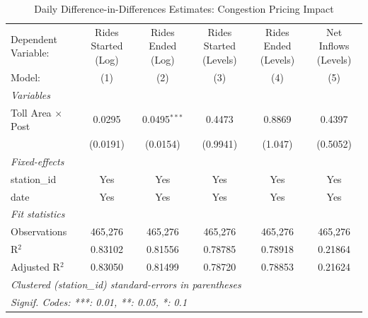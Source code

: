
\begin{table}[htbp]
   \caption{\label{tab:did_static_daily} Daily Difference-in-Differences Estimates: Congestion Pricing Impact}
   \centering
   \begin{tabular}{lccccc}
      \tabularnewline \midrule \midrule
      Dependent Variable:      & Rides Started (Log) & Rides Ended (Log) & Rides Started (Levels) & Rides Ended (Levels) & Net Inflows (Levels) \\   
      Model:                   & (1)                 & (2)               & (3)                    & (4)                  & (5)\\  
      \midrule
      \emph{Variables}\\
      Toll Area $\times$ Post  & 0.0295              & 0.0495$^{***}$    & 0.4473                 & 0.8869               & 0.4397\\   
                               & (0.0191)            & (0.0154)          & (0.9941)               & (1.047)              & (0.5052)\\   
      \midrule
      \emph{Fixed-effects}\\
      station\_id              & Yes                 & Yes               & Yes                    & Yes                  & Yes\\  
      date                     & Yes                 & Yes               & Yes                    & Yes                  & Yes\\  
      \midrule
      \emph{Fit statistics}\\
      Observations             & 465,276             & 465,276           & 465,276                & 465,276              & 465,276\\  
      R$^2$                    & 0.83102             & 0.81556           & 0.78785                & 0.78918              & 0.21864\\  
      Adjusted R$^2$           & 0.83050             & 0.81499           & 0.78720                & 0.78853              & 0.21624\\  
      \midrule \midrule
      \multicolumn{6}{l}{\emph{Clustered (station\_id) standard-errors in parentheses}}\\
      \multicolumn{6}{l}{\emph{Signif. Codes: ***: 0.01, **: 0.05, *: 0.1}}\\
   \end{tabular}
\end{table}


